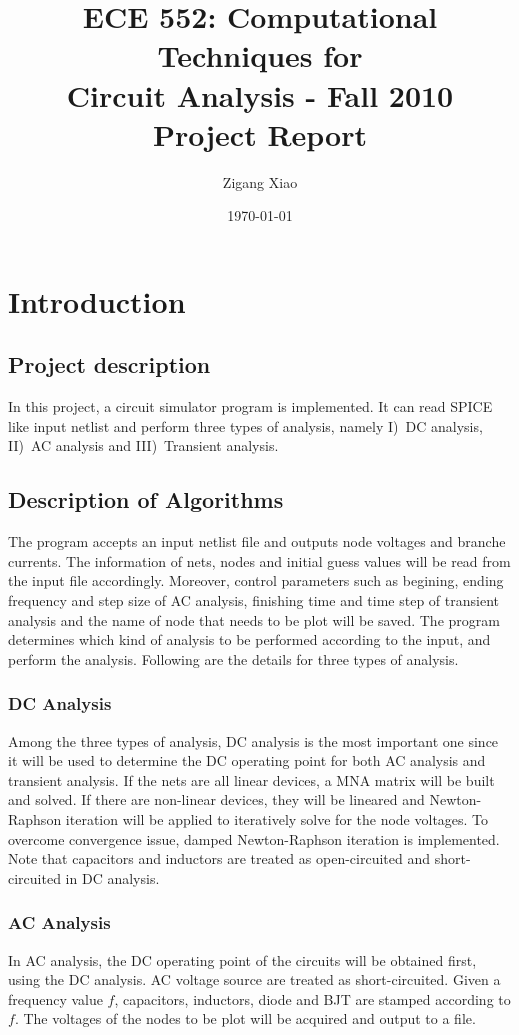 \documentclass[12pt]{article}
\title{ECE 552: Computational Techniques for \\Circuit Analysis - Fall 2010\\
Project Report}
\author{Zigang Xiao}
\date{\today}
\begin{document}
\maketitle

\section{Introduction}
\subsection{Project description}
In this project, a circuit simulator program is implemented.
It can read SPICE like input netlist and perform three types of 
analysis, namely I)~DC analysis, II)~AC analysis and III)~Transient analysis.

\subsection{Description of Algorithms}
The program accepts an input netlist file and outputs node voltages and branche
currents.  The information of nets, nodes and initial guess values will be read
from the input file accordingly.  Moreover, control parameters such as
begining, ending frequency and step size of AC analysis, finishing time and
time step of transient analysis and the name of node that needs to be plot will
be saved. The program determines which kind of analysis to be performed
according to the input, and perform the analysis.  Following are the details
for three types of analysis.

\subsubsection{DC Analysis}
Among the three types of analysis, DC analysis is the most important one since 
it will be used to determine the DC operating point for both AC analysis and
transient analysis.
If the nets are all linear devices, a MNA matrix will be built and solved.
If there are non-linear devices, they will be lineared and 
Newton-Raphson iteration will be applied to iteratively solve for the node
voltages. To overcome convergence issue, damped Newton-Raphson iteration is implemented.
Note that capacitors and inductors are treated as open-circuited and short-circuited
in DC analysis.

\subsubsection{AC Analysis}
In AC analysis, the DC operating point of the circuits will be obtained first, 
using the DC analysis. AC voltage source are treated as short-circuited.
Given a frequency value $f$, capacitors, inductors, diode and BJT are stamped 
according to $f$.
The voltages of the nodes to be plot will be acquired and output to a file.
\end{document}
